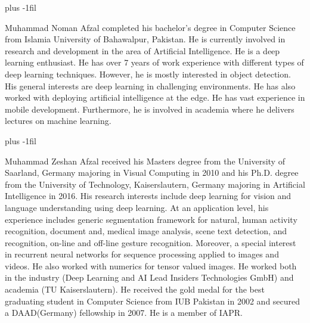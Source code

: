 \documentclass{ieeeaccess}
\begin{document}
\vskip 0pt plus -1fil
\begin{IEEEbiography}{Muhammad Noman Afzal} completed his bachelor's degree in Computer Science from Islamia University of Bahawalpur, Pakistan. He is currently involved in research and development in the area of Artificial Intelligence. He is a  deep learning enthusiast. He has over 7 years of work experience with different types of deep learning techniques. However, he is mostly interested in object detection. His general interests are deep learning in challenging environments. He has also worked with deploying artificial intelligence at the edge. He has vast experience in mobile development. Furthermore, he is involved in academia where he delivers lectures on machine learning.
\end{IEEEbiography}

\vskip 0pt plus -1fil
\begin{IEEEbiography}{Muhammad Zeshan Afzal} received his Masters degree from the University of Saarland, Germany majoring in Visual Computing in 2010 and his Ph.D. degree from the University of Technology, Kaiserslautern, Germany majoring in Artificial Intelligence in 2016. His research interests include deep learning for vision and language understanding using deep learning.  At an application level, his experience includes generic segmentation framework for natural, human activity recognition, document and, medical image analysis, scene text detection, and recognition, on-line and off-line gesture recognition. Moreover, a special interest in recurrent neural networks for sequence processing applied to images and videos. He also worked with numerics for tensor valued images. He worked both in the industry (Deep Learning and AI Lead Insiders Technologies GmbH) and academia (TU Kaiserslautern). He received the gold medal for the best graduating student in Computer Science from IUB Pakistan in 2002 and secured a DAAD(Germany) fellowship in 2007. He is a member of IAPR. 
\end{IEEEbiography}

\EOD
\end{document}
